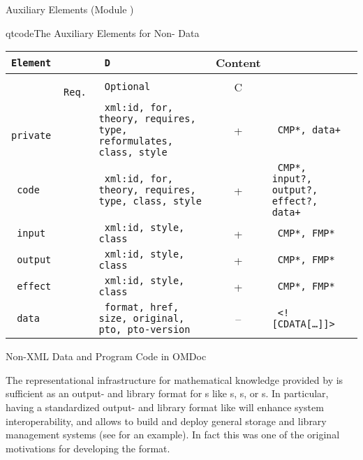 \begin{tchapter}[id=ext,short=Auxiliary Elements]{Auxiliary Elements (Module {})}
\begin{myfig}{qtcode}{The {\omdoc} Auxiliary Elements for Non-{\xml} Data}
\begin{scriptsize}
\begin{tabular}{|>{\tt}l|>{\tt}l|>{\tt}p{}|c|>{\tt}p{}|}\hline
{\rm Element}& \multicolumn{2}{l|}{Attributes\hspace*{2.25cm}} & D & Content  \\\hline
             & {\rm Req.} & {\rm Optional}     & C &           \\\hline\hline
 private     &            & xml:id, for, theory, 
                               requires, type, reformulates, class, style
                                               & +  & CMP*, data+ \\\hline
 code        &            & xml:id, for, theory, 
                              requires, type, class, style
                              & +  & CMP*, input?, output?, effect?, data+ \\\hline
 input       &            & xml:id, style, class   & + & CMP*, FMP*\\\hline
 output      &            & xml:id, style, class   & + & CMP*, FMP*\\\hline
 effect      &            & xml:id, style, class   & + & CMP*, FMP*\\\hline
 data        &            & format, href, size, original, pto, pto-version 
                                               & -- & <![CDATA[\ldots]]> \\\hline
\end{tabular}
\end{scriptsize}
\end{myfig}


\begin{tsection}[id=private]{Non-XML Data and Program Code in OMDoc}
  
  The representational infrastructure for mathematical knowledge provided by {\omdoc} is
  sufficient as an output- and library format for
  {s} like {s},
  {s}, or {s}. In
  particular, having a standardized output- and library format like {\omdoc} will enhance
  system interoperability, and allows to build and deploy general storage and library
  management systems (see {} for an {\omdoc} example). In fact this was
  one of the original motivations for developing the format.
  

\end{tsection}
\end{tchapter}
